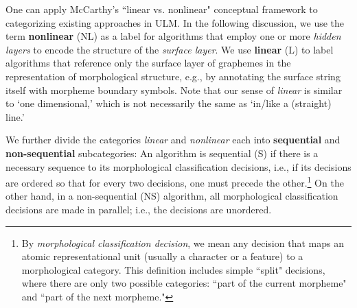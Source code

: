 One can apply McCarthy's ``linear vs. nonlinear" conceptual framework to categorizing existing approaches in ULM.
In the following discussion, we
use the term \textbf{nonlinear} (NL) as a label for algorithms that employ one
or more \textit{hidden layers} to encode the structure of the
\textit{surface layer}.
We use \textbf{linear} (L) %
to label
algorithms that reference only the surface layer of graphemes in the representation of
morphological structure, e.g., by annotating the
 surface string itself with morpheme boundary symbols. Note that our sense of \textit{linear} is similar to `one dimensional,' which is not necessarily the same as `in/like a (straight) line.'
%

We further divide the categories
\textit{linear} and \textit{nonlinear} each into
\textbf{sequential} and \textbf{non-sequential} subcategories:
An algorithm is sequential (S) if there is a necessary sequence to its morphological classification decisions, i.e., if its decisions are ordered so that for every two decisions, one must precede the other.\footnote{By \textit{morphological 
classification decision}, we mean any decision that maps an atomic representational unit (usually a character or a feature) to a morphological category. This definition includes simple ``split" decisions, where there are only two possible categories: ``part of the current morpheme" and ``part of the next morpheme."}
On the other hand, in a non-sequential (NS) algorithm, all morphological classification decisions are made in parallel; i.e., the decisions are unordered.

